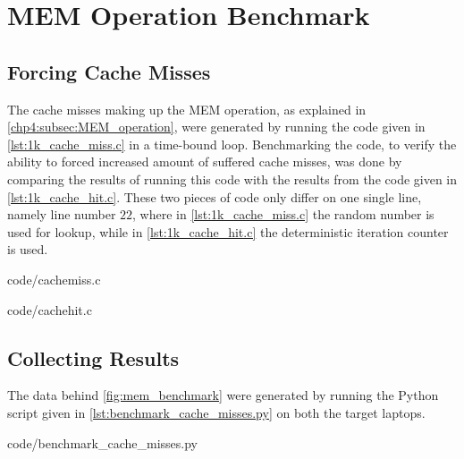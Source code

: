 \chapter{MEM Operation Benchmark}\label{apx:mem_benchmark}

\section{Forcing Cache Misses}

The cache misses making up the MEM operation, as explained in \autoref{chp4:subsec:MEM_operation}, were generated by running the code given in \autoref{lst:1k_cache_miss.c} in a time-bound loop.
Benchmarking the code, to verify the ability to forced increased amount of  suffered cache misses, was done by comparing the results of running this code with the results from the code given in \autoref{lst:1k_cache_hit.c}.
These two pieces of code only differ on one single line, namely line number $22$, where in \autoref{lst:1k_cache_miss.c} the random number is used for lookup, while in \autoref{lst:1k_cache_hit.c} the deterministic iteration counter is used.

\begin{lstinputlisting}[language=C, caption={1k\_cache\_miss.c - Force 1000 cache misses}, label={lst:1k_cache_miss.c}]{code/cachemiss.c}
\end{lstinputlisting}

\begin{lstinputlisting}[language=C, caption={1k\_cache\_hit.c - Cache miss reference}, label={lst:1k_cache_hit.c}]{code/cachehit.c}
\end{lstinputlisting}

\section{Collecting Results}

The data behind \autoref{fig:mem_benchmark} were generated by running the Python script given in \autoref{lst:benchmark_cache_misses.py} on both the target laptops.

\begin{lstinputlisting}[language=Python, caption={benchmark\_cache\_misses.py - Collect data from 1000 runs of the forced cache miss and reference benchmark utilities.}, label={lst:benchmark_cache_misses.py}]{code/benchmark_cache_misses.py}
\end{lstinputlisting}
